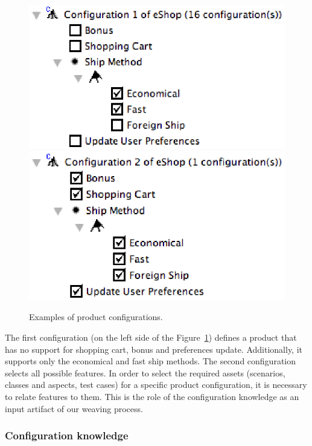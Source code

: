 \documentclass{acm_proc_article-sp}
\begin{document}
\begin{figure}[htb]
  \centerline{
    \mbox{\includegraphics[scale=0.4]{img/pc-01.eps}}
    \mbox{\includegraphics[scale=0.4]{img/pc-02.eps}}
  }
  \caption{Examples of product configurations.}
  \label{fig:product-config-01-02}
  \end{figure}
  
The first configuration (on the left side of the Figure~\ref{fig:product-config-01-02}) defines a product that has no support for shopping cart, bonus and preferences update. Additionally, it supports only the economical and fast ship methods. The second configuration selects all possible features. 
In order to select the required assets (scenarios, classes and aspects, test cases) for a specific product configuration, it is necessary to relate features to them. This is the role of the configuration knowledge as an input artifact of our weaving process.  

\subsubsection{Configuration knowledge}
\end{document}
